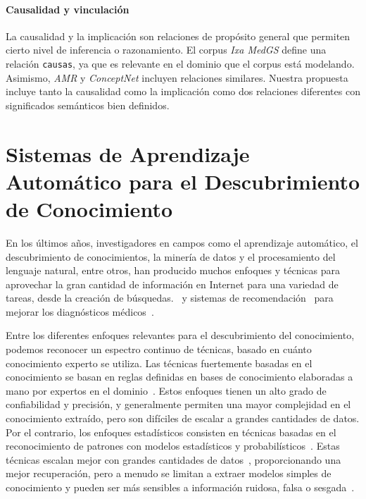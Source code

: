 \paragraph{Causalidad y vinculación}

La causalidad y la implicación son relaciones de propósito general que permiten cierto nivel de inferencia o razonamiento. El corpus \textit{Ixa MedGS} define una relación \texttt{causas}, ya que es relevante en el dominio que el corpus está modelando. Asimismo, \textit{AMR} y \textit{ConceptNet} incluyen relaciones similares. Nuestra propuesta incluye tanto la causalidad como la implicación como dos relaciones diferentes con significados semánticos bien definidos.

\section{Sistemas de Aprendizaje Automático para el Descubrimiento de Conocimiento}

En los últimos años, investigadores en campos como el aprendizaje automático, el descubrimiento de conocimientos, la minería de datos y el procesamiento del lenguaje natural, entre otros, han producido muchos enfoques y técnicas para aprovechar la gran cantidad de información en Internet para una variedad de tareas, desde la creación de búsquedas.~\cite{google} y sistemas de recomendación~\cite{youtube} para mejorar los diagnósticos médicos~\cite{watson}.

Entre los diferentes enfoques relevantes para el descubrimiento del conocimiento, podemos reconocer un espectro continuo de técnicas, basado en cuánto conocimiento experto se utiliza. Las técnicas fuertemente basadas en el conocimiento se basan en reglas definidas en bases de conocimiento elaboradas a mano por expertos en el dominio~\cite{chandrasekaran1986generic}. Estos enfoques tienen un alto grado de confiabilidad y precisión, y generalmente permiten una mayor complejidad en el conocimiento extraído, pero son difíciles de escalar a grandes cantidades de datos. Por el contrario, los enfoques estadísticos consisten en técnicas basadas en el reconocimiento de patrones con modelos estadísticos y probabilísticos~\cite{kevin2012machine}. Estas técnicas escalan mejor con grandes cantidades de datos~\cite{le2013building}, proporcionando una mejor recuperación, pero a menudo se limitan a extraer modelos simples de conocimiento y pueden ser más sensibles a información ruidosa, falsa o sesgada~\cite{bolukbasi2016man}.

